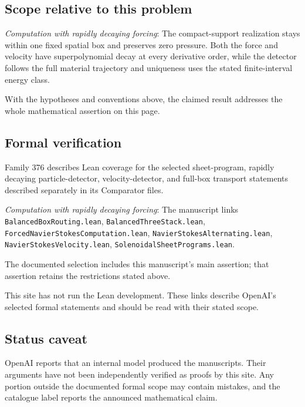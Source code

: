 \documentclass[11pt]{article}
\begin{document}
\subsection{Scope relative to this problem}
\textit{Computation with rapidly decaying forcing}: The compact-support realization stays within one fixed spatial box and preserves zero pressure. Both the force and velocity have superpolynomial decay at every derivative order, while the detector follows the full material trajectory and uniqueness uses the stated finite-interval energy class.

With the hypotheses and conventions above, the claimed result addresses the whole mathematical assertion on this page.

\subsection{Formal verification}
Family 376 describes Lean coverage for the selected sheet-program, rapidly decaying particle-detector, velocity-detector, and full-box transport statements described separately in its Comparator files.

\textit{Computation with rapidly decaying forcing}: The manuscript links \texttt{BalancedBoxRouting.lean}, \texttt{BalancedThreeStack.lean}, \texttt{ForcedNavierStokesComputation.lean}, \texttt{NavierStokesAlternating.lean}, \texttt{NavierStokesVelocity.lean}, \texttt{SolenoidalSheetPrograms.lean}.

The documented selection includes this manuscript’s main assertion; that assertion retains the restrictions stated above.

This site has not run the Lean development. These links describe OpenAI’s selected formal statements and should be read with their stated scope.

\subsection{Status caveat}
OpenAI reports that an internal model produced the manuscripts. Their arguments have not been independently verified as proofs by this site. Any portion outside the documented formal scope may contain mistakes, and the catalogue label reports the announced mathematical claim.
\end{document}
